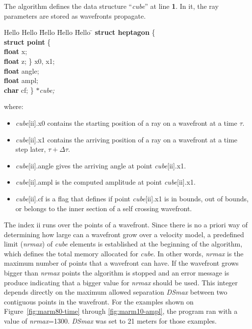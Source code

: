 The algorithm defines the data structure ``{\it cube\/}'' at line {\bf 1}.
In it, the ray parameters are stored as wavefronts
propagate.

\begin{tabbing}
Hello Hello \= Hello \= Hello \= Hello \=       \kill
\> {\bf struct heptagon} \{     \\
\> \>  {\bf struct point} \{    \\
\> \> \>    {\bf float} x;      \\
\> \> \>    {\bf float} z; \} x0, x1;   \\
\> \>  {\bf float} angle;       \\
\> \>  {\bf float} ampl;        \\
\> \>  {\bf char} cf; \} $*$\it cube;
\end{tabbing}

where:
\begin{itemize}
\item {\it cube\/}[ii].x0 contains the starting position of a ray on a
wavefront at a time $\tau$. 
\item {\it cube\/}[ii].x1 contains the arriving position of a ray on a
wavefront at a time step later, $\tau + \Delta \tau$. 
\item {\it cube\/}[ii].angle gives the arriving angle 
at point {\it cube\/}[ii].x1.
\item {\it cube\/}[ii].ampl is the computed amplitude 
at point {\it cube\/}[ii].x1.
\item {\it cube\/}[ii].cf is a flag that defines if point 
{\it cube\/}[ii].x1 is
in bounds, out of bounds, or belongs to the inner section of
a self crossing wavefront.
\end{itemize}

The index ii runs over the points of a wavefront. 
Since there is no a priori way of determining how large can a
wavefront grow over a velocity model, a predefined limit ({\it nrmax})
of {\it cube\/} elements 
is established at the beginning of the algorithm, which defines
the total memory allocated for {\it cube\/}. In other words, 
{\it nrmax} is the maximum number of points that a wavefront can have.
If the wavefront grows bigger than {\it nrmax} points the algorithm is
stopped and an error message is produce indicating that a bigger
value for {\it nrmax} should be used.
This
integer depends directly on the maximum allowed separation {\it DSmax\/}
between
two contiguous points in the wavefront. For the examples shown on
Figure~\ref{fig:marm80-time} through \ref{fig:marm10-ampl}, the program ran 
with a value of {\it nrmax}=1300. {\it DSmax\/} was set to 21 meters
for those examples. 

